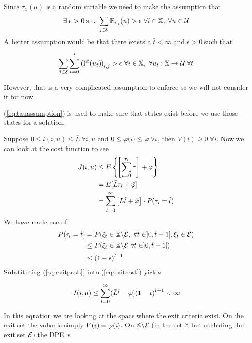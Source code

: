 Since $\tau_x(\mu)$ is a random variable we need to make the assumption that
\begin{align}
\label{eq:tauassumption}
\exists~\epsilon>0 \text{~s.t.~} \sum_{j\in\mathcal{E}}\mathbb{P}_{i,j}(u)>\epsilon~\forall i\in\mathbb{X},~\forall u\in\mathcal{U}
\end{align}
A better assumption would be that there exists a $\bar{t}<\infty$ and $\epsilon>0$ such that

\begin{equation*}
\sum_{j\in\mathcal{E}}\sum_{t=0}^t{(\mathbb{P}^t(u_t))}_{i,j}>\epsilon~\forall i\in\mathbb{X},~\forall u_t:\mathbb{X}\to\mathcal{U}~\forall t
\end{equation*}

However, that is a very complicated assumption to enforce so we will not consider it for now.

(\ref{eq:tauassumption}) is used to make sure that states exist before we use those states for a solution.

Suppose $0\leq l(i,u)\leq \bar{L}~\forall i,u$ and $0\leq \varphi(i) \leq \bar{\varphi}~\forall i$, then $V(i)\geq0~\forall i$.
Now we can look at the cost function to see
\begin{align}
\label{eq:exitcost}
J(i,u) &\leq E\left\lbrace \left[\sum_{t=0}^{\tau_i}\tau\right] + \bar{\varphi}\right\rbrace \nonumber \\
&= E[\bar{L}\tau_i+\bar{\varphi}] \nonumber \\
&= \sum_{\hat{t}=0}^\infty\left[\bar{L}\hat{t}+\bar{\varphi}\right]\cdot P(\tau_i=\hat{t})
\end{align}
We have made use of
\begin{align}
\label{eq:exitprob}
P(\tau_i=\hat{t}) &= P(\xi_t\in\mathbb{X}\backslash\cale,~\forall t\in]0,\hat{t}-1[, \xi_t\in\cale) \nonumber \\%
&\leq P(\xi_t\in\mathbb{X}\backslash\cale~\forall t\in]0,\hat{t}-1[) \nonumber \\%
&\leq {(1-\epsilon)}^{\hat{t}-1}
\end{align}
Substituting (\ref{eq:exitprob}) into (\ref{eq:exitcost}) yields

\begin{equation*}
J(i,\mu) \leq \sum_{t=0}^\infty (\bar{L}\hat{t}-\bar{\varphi}){(1-\epsilon)}^{\hat{t}-1}<\infty
\end{equation*}

In this equation we are looking at the space where the exit criteria exist.
On the exit set the value is simply $V(i)=\varphi(i)$.
On $\mathbb{X}\backslash\mathcal{E}$ (in the set $\mathbb{X}$ but excluding the exit set $\mathcal{E}$) the DPE is


